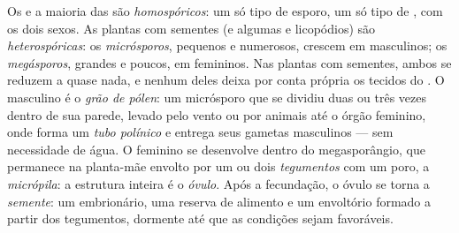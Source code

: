 \begin{definition}\label{def:b2:plant-life-cycles:heterospory}
Os  e a maioria das  são \emph{homospóricos}: um só
tipo de esporo, um só tipo de , com os dois sexos. As
plantas com sementes (e algumas  e licopódios) são
\emph{heterospóricas}: os \emph{micrósporos}, pequenos e numerosos,
crescem em  masculinos; os \emph{megásporos}, grandes e
poucos, em  femininos. Nas plantas com sementes, ambos se
reduzem a quase nada, e nenhum deles deixa por conta própria os
tecidos do . O  masculino é o \emph{grão de
pólen}: um micrósporo que se dividiu duas ou três vezes dentro de sua
parede, levado pelo vento ou por animais até o órgão feminino, onde
forma um \emph{tubo polínico} e entrega seus gametas masculinos ---
sem necessidade de água. O  feminino se desenvolve dentro do
megasporângio, que permanece na planta-mãe envolto por um ou dois
\emph{tegumentos} com um poro, a \emph{micrópila}: a estrutura inteira
é o \emph{óvulo}. Após a fecundação, o óvulo se torna a
\emph{semente}: um  embrionário, uma reserva de alimento e
um envoltório formado a partir dos tegumentos, dormente até que as
condições sejam favoráveis.
\end{definition}


